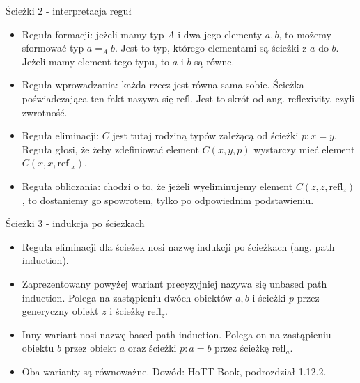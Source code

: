 \documentclass{beamer}
\newcommand{\refl}[1]{\text{refl}_{#1}}
\begin{document}
\begin{frame}{Ścieżki 2 - interpretacja reguł}
\begin{itemize}
	\item Reguła formacji: jeżeli mamy typ $A$ i dwa jego elementy $a, b$, to możemy sformować typ $a =_A b$. Jest to typ, którego elementami są ścieżki z $a$ do $b$. Jeżeli mamy element tego typu, to $a$ i $b$ są równe.
	\item Reguła wprowadzania: każda rzecz jest równa sama sobie. Ścieżka poświadczająca ten fakt nazywa się $\text{refl}$. Jest to skrót od ang. reflexivity, czyli zwrotność.
	\item Reguła eliminacji: $C$ jest tutaj rodziną typów zależącą od ścieżki $p : x = y$. Reguła głosi, że żeby zdefiniować element $C(x, y, p)$ wystarczy mieć element $C(x, x, \refl{x})$.
	\item Reguła obliczania: chodzi o to, że jeżeli wyeliminujemy element $C(z, z, \refl{z})$, to dostaniemy go spowrotem, tylko po odpowiednim podstawieniu.
\end{itemize}
\end{frame}

\begin{frame}{Ścieżki 3 - indukcja po ścieżkach}
\begin{itemize}
	\item Reguła eliminacji dla ścieżek nosi nazwę indukcji po ścieżkach (ang. path induction).
	\item Zaprezentowany powyżej wariant precyzyjniej nazywa się unbased path induction. Polega na zastąpieniu dwóch obiektów $a, b$ i ścieżki $p$ przez generyczny obiekt $z$ i ścieżkę $\refl{z}$.
	\item Inny wariant nosi nazwę based path induction. Polega on na zastąpieniu obiektu $b$ przez obiekt $a$ oraz ścieżki $p : a = b$ przez ścieżkę $\refl{a}$.
	\item Oba warianty są równoważne. Dowód: HoTT Book, podrozdział 1.12.2.
\end{itemize}
\end{frame}
\end{document}
